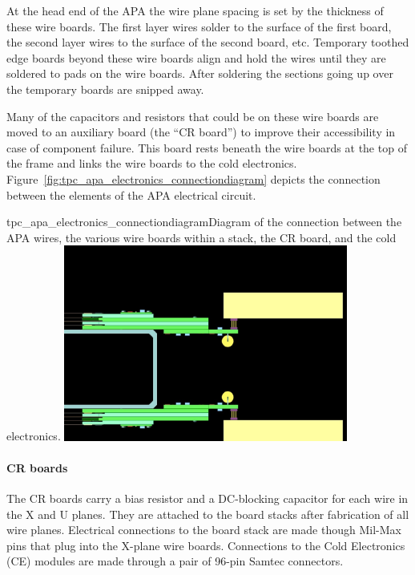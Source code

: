 At the head end of the APA the wire plane spacing is set by the thickness of these wire boards.  The first layer wires solder to the surface of the first board, the second layer wires to the surface of the second board, etc.  Temporary toothed edge boards beyond these wire boards align and hold the wires until they are soldered to pads on the wire boards.  After soldering the sections going up over the temporary boards are snipped away.

Many of the capacitors and resistors that could be on these wire boards are moved to an auxiliary board (the ``CR board'') to improve their accessibility in case of component failure.  This board rests beneath the wire boards at the top of the frame and links the wire boards to the cold electronics.  Figure~\ref{fig:tpc_apa_electronics_connectiondiagram} depicts the connection between the elements of the APA electrical circuit.

\begin{cdrfigure}{tpc_apa_electronics_connectiondiagram}{Diagram of the connection between the APA wires, the various wire boards within a stack, the CR board, and the cold electronics}.
\includegraphics[width=0.7\textwidth]{figures/tpc_apa_electronics_connectiondiagram.png}
\end{cdrfigure}

\paragraph{CR boards}

The CR boards carry a bias resistor and a DC-blocking capacitor for each wire in the X and U planes. They are attached to the board stacks after fabrication of all wire planes.  Electrical connections to the board stack are made though Mil-Max pins that plug into the X-plane wire boards. Connections to the Cold Electronics (CE) modules are made through a pair of 96-pin Samtec connectors.


